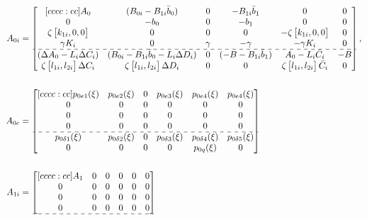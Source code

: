\documentclass[../main.tex]{subfiles}
\begin{document}
\begin{align}
A_{0i} &= 
\begin{bmatrix}[cccc:cc]
A_0 & (B_{0i} - B_{1i}\bar{b}_0) & 0 & -B_{1i}\bar{b}_1 & 0 & 0\\
%
0 & -b_0 & 0 & -b_1 & 0 & 0\\
\zeta \begin{bmatrix}k_{1i} , 0 , 0\end{bmatrix} & 0 & 0 & 0 & -\zeta\begin{bmatrix}k_{1i} , 0 , 0\end{bmatrix} & 0\\
%
\gamma K_i & 0 & \gamma & -\gamma & -\gamma K_i & 0\\ \hdashline
%
(\Delta A_0 - L_i \Delta C_i) & (B_{0i} - B_{1i}\bar{b}_0 - L_i\Delta D_i) & 0 & (-B - B_{1i}\bar{b}_1 )& A_0 - L_i\bar{C}_i & -B\\ 
%
\zeta \begin{bmatrix}l_{1i} , l_{2i}	\end{bmatrix} \Delta C_i & \zeta \begin{bmatrix}l_{1i} , l_{2i}	\end{bmatrix} \Delta D_i & 0 & 0 & \zeta \begin{bmatrix}l_{1i} , l_{2i}	\end{bmatrix} \bar{C}_i & 0
\end{bmatrix}, \nonumber \\
\nonumber\\
A_{0c} &= 
\begin{bmatrix}[cccc:cc]
p_{0e1}(\xi) & p_{0e2}(\xi) & 0 & p_{0e3}(\xi) & p_{0e4}(\xi) & p_{0e4}(\xi) \\
0 & 0 & 0 & 0 & 0 & 0 \\
0 & 0 & 0 & 0 & 0 & 0 \\
0 & 0 & 0 & 0 & 0 & 0 \\ \hdashline
p_{0\delta 1}(\xi) & p_{0\delta 2}(\xi) & 0 & p_{0\delta 3}(\xi) & p_{0\delta 4}(\xi) & p_{0\delta 5}(\xi) \\
0 & 0 & 0 & 0 & p_{0q}(\xi) & 0
\end{bmatrix} \nonumber\\
\nonumber\\
A_{1i} &= 
\begin{bmatrix}[cccc:cc]
A_1 & 0 & 0 & 0 & 0 & 0\\
%
0 & 0 & 0 & 0 & 0 & 0\\
0 & 0 & 0 & 0 & 0 & 0\\
%
0 & 0 & 0 & 0 & 0 & 0\\ \hdashline

\end{bmatrix}
\end{align}
\end{document}
